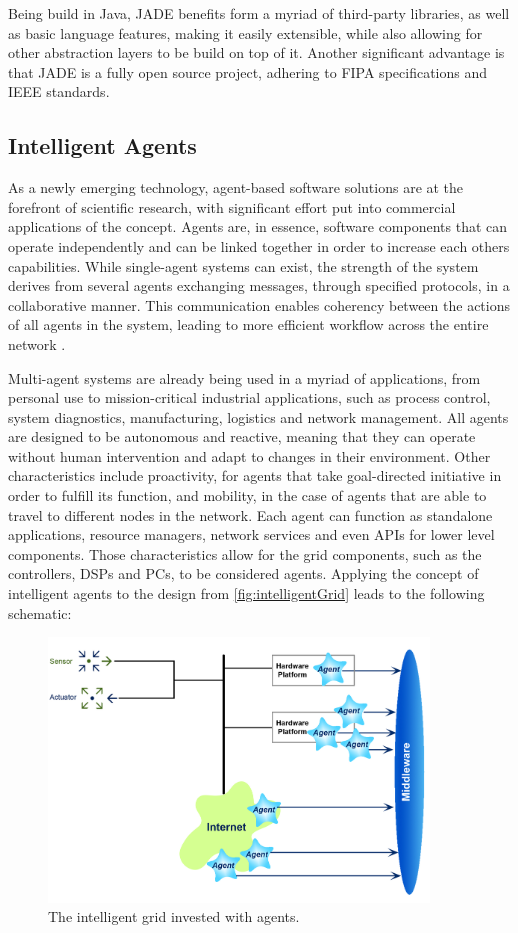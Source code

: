 \documentclass[12pt, english, a4paper]{report}
\begin{document}
Being build in Java, JADE benefits form a myriad of third-party libraries, as well as basic language features, making it easily extensible,
while also allowing for other abstraction layers to be build on top of it. Another significant advantage is that JADE is a fully open source
project, adhering to FIPA specifications and IEEE standards.

\subsection{Intelligent Agents}

As a newly emerging technology, agent-based software solutions are at the forefront of scientific research, with significant effort put into
commercial applications of the concept. Agents are, in essence, software components that can operate independently and can be linked together
in order to increase each others capabilities. While single-agent systems can exist, the strength of the system derives from several agents
exchanging messages, through specified protocols, in a collaborative manner. This communication enables coherency between the actions of all
agents in the system, leading to more efficient workflow across the entire network \cite{24, 105}.

Multi-agent systems are already being used in a myriad of applications, from personal use to mission-critical industrial applications, such
as process control, system diagnostics, manufacturing, logistics and network management. All agents are designed to be autonomous and reactive,
meaning that they can operate without human intervention and adapt to changes in their environment. Other characteristics include proactivity, 
for agents that take goal-directed initiative in order to fulfill its function, and mobility, in the case of agents that are able to travel
to different nodes in the network. Each agent can function as standalone applications, resource managers, network services and even APIs for
lower level components. Those characteristics allow for the grid components, such as the controllers, DSPs and PCs, to be considered agents.
Applying the concept of intelligent agents to the design from \cref{fig:intelligentGrid} leads to the following schematic:

\begin{figure}[H]
	\includegraphics[width=0.9\textwidth, height=0.50\textwidth]{Pic5}
    \caption{The intelligent grid invested with agents. \cite{88} \label{fig:intelligentGridWithAgents}}
\end{figure}
\end{document}
